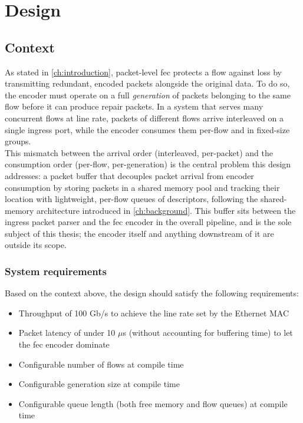 \chapter{Design}\label{ch:design}

\section{Context} %
As stated in \cref{ch:introduction}, packet-level \gls{fec} protects a flow against loss by
transmitting redundant, encoded packets alongside the original data. To do so, the encoder
must operate on a full \emph{generation} of packets belonging to the same flow before it can
produce repair packets. In a system that serves many concurrent flows at line rate, packets
of different flows arrive interleaved on a single ingress port, while the encoder consumes
them per-flow and in fixed-size groups. \\

This mismatch between the arrival order (interleaved,
per-packet) and the consumption order (per-flow, per-generation) is the central problem this
design addresses: a packet buffer that decouples packet arrival from encoder consumption by
storing packets in a shared memory pool and tracking their location with lightweight,
per-flow queues of descriptors, following the shared-memory architecture introduced in
\ref{ch:background}. This buffer sits between the ingress packet parser and the \gls{fec}
encoder in the overall pipeline, and is the sole subject of this thesis; the encoder itself
and anything downstream of it are outside its scope.

\subsection{System requirements}\label{system_requirements}
Based on the context above, the design should satisfy the following requirements:
\begin{itemize}
  \item Throughput of 100 Gb/s to achieve the line rate set by the Ethernet MAC
  \item Packet latency of under 10 $\mu$s (without accounting for buffering time) to let the \gls{fec} encoder dominate
  \item Configurable number of flows at compile time
  \item Configurable generation size at compile time
  \item Configurable queue length (both free memory and flow queues) at compile time
\end{itemize}

